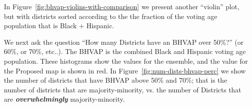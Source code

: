 \documentclass[letterpaper]{article}
\begin{document}
\bigskip

In Figure~\ref{fig:bhvap-violins-with-comparison} we present another ``violin'' plot, but with districts sorted according to the
the fraction of the voting age population that is Black + Hispanic. 





\bigskip

We next ask the question ``How many Districts have an BHVAP over 50\%?'' (or 60\%, or 70\%, etc..). The
BHVAP is the combined Black and Hispanic voting age population. These histograms show the values for the ensemble, and
the value for the Proposed map is shown in red. In Figure~\ref{fig:num-dists-bhvap-perc} we show the number of districts that have BHVAP above 50\% and 70\%; that is the number of districts that are majority-minority, vs. the number of Districts that are
\textbf{\textit{overwhelmingly}} majority-minority. 
\end{document}
